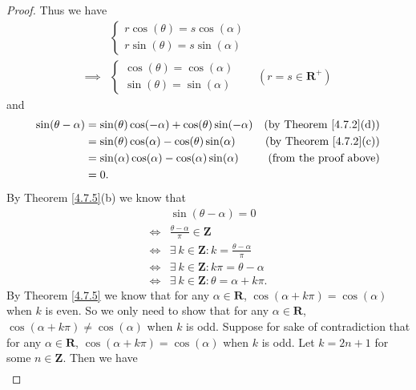 \begin{proof}
    Thus we have
    \begin{align*}
                 & \begin{cases}
            r \cos(\theta) = s \cos(\alpha) \\
            r \sin(\theta) = s \sin(\alpha)
        \end{cases}                            \\
        \implies & \begin{cases}
            \cos(\theta) = \cos(\alpha) \\
            \sin(\theta) = \sin(\alpha)
        \end{cases} & (r = s \in \mathbf{R}^+)
    \end{align*}
    and
    \begin{align*}
        \sin(\theta - \alpha) & = \sin(\theta) \cos(-\alpha) + \cos(\theta) \sin(-\alpha) & \text{(by Theorem \ref{4.7.2}(d))} \\
                              & = \sin(\theta) \cos(\alpha) - \cos(\theta) \sin(\alpha)   & \text{(by Theorem \ref{4.7.2}(c))} \\
                              & = \sin(\alpha) \cos(\alpha) - \cos(\alpha) \sin(\alpha)   & \text{(from the proof above)}      \\
                              & = 0.
    \end{align*}
    By Theorem \ref{4.7.5}(b) we know that
    \begin{align*}
             & \sin(\theta - \alpha) = 0                                   \\
        \iff & \frac{\theta - \alpha}{\pi} \in \mathbf{Z}                  \\
        \iff & \exists\ k \in \mathbf{Z} : k = \frac{\theta - \alpha}{\pi} \\
        \iff & \exists\ k \in \mathbf{Z} : k \pi = \theta - \alpha         \\
        \iff & \exists\ k \in \mathbf{Z} : \theta = \alpha + k \pi.
    \end{align*}
    By Theorem \ref{4.7.5} we know that for any \(\alpha \in \mathbf{R}\), \(\cos(\alpha + k \pi) = \cos(\alpha)\) when \(k\) is even.
    So we only need to show that for any \(\alpha \in \mathbf{R}\), \(\cos(\alpha + k \pi) \neq \cos(\alpha)\) when \(k\) is odd.
    Suppose for sake of contradiction that for any \(\alpha \in \mathbf{R}\), \(\cos(\alpha + k \pi) = \cos(\alpha)\) when \(k\) is odd.
    Let \(k = 2n + 1\) for some \(n \in \mathbf{Z}\).
    Then we have
    \begin{align*}

\end{align*}
\end{proof}
